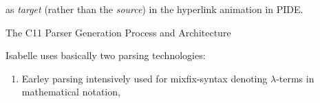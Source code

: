 \begin{isabellebody}
\begin{isamarkuptext}
as \emph{target} (rather than the \emph{source}) in the hyperlink animation in PIDE.%
\end{isamarkuptext}\isamarkuptrue%
%
\begin{isamarkupsection*}%
[label = {frontend_arch},type = {scholarly_paper.technical}, args={label = {frontend_arch},type = {scholarly_paper.technical}, Isa_COL.text_element.level = {}, Isa_COL.text_element.referentiable = {False}, Isa_COL.text_element.variants = {{STR ''outline'', STR ''document''}}, scholarly_paper.text_section.main_author = {}, scholarly_paper.text_section.fixme_list = {}, Isa_COL.text_element.level = {}, scholarly_paper.technical.definition_list = {}}]The C11 Parser Generation Process and Architecture%
\end{isamarkupsection*}\isamarkuptrue%
%
\begin{isamarkuptext}%
Isabelle uses basically two parsing technologies:

%
\begin{enumerate}%
\item Earley parsing \cite{DBLP:journals/cacm/Earley70}
intensively used for mixfix-syntax denoting $\lambda$-terms in mathematical notation,


\end{enumerate}
\end{isamarkuptext}
\end{isabellebody}
